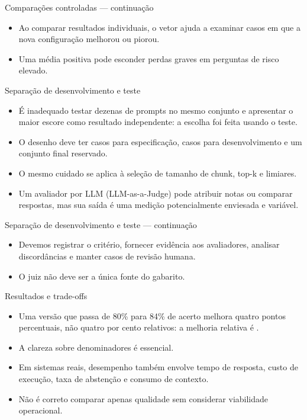 \documentclass[10pt,aspectratio=169]{beamer}
\begin{document}
\begin{frame}[t]{Comparações controladas — continuação}
\small
\begin{itemize}
\item Ao comparar resultados individuais, o vetor ajuda a examinar casos em que a nova configuração melhorou ou piorou.
\item Uma média positiva pode esconder perdas graves em perguntas de risco elevado.
\end{itemize}
\end{frame}

\begin{frame}[t]{Separação de desenvolvimento e teste}
\small
\begin{itemize}
\item É inadequado testar dezenas de prompts no mesmo conjunto e apresentar o maior escore como resultado independente: a escolha foi feita usando o teste.
\item O desenho deve ter casos para especificação, casos para desenvolvimento e um conjunto final reservado.
\item O mesmo cuidado se aplica à seleção de tamanho de chunk, top-k e limiares.
\item Um avaliador por LLM (LLM-as-a-Judge) pode atribuir notas ou comparar respostas, mas sua saída é uma medição potencialmente enviesada e variável.
\end{itemize}
\end{frame}

\begin{frame}[t]{Separação de desenvolvimento e teste — continuação}
\small
\begin{itemize}
\item Devemos registrar o critério, fornecer evidência aos avaliadores, analisar discordâncias e manter casos de revisão humana.
\item O juiz não deve ser a única fonte do gabarito.
\end{itemize}
\end{frame}

\begin{frame}[t]{Resultados e trade-offs}
\small
\begin{itemize}
\item Uma versão que passa de 80\% para 84\% de acerto melhora quatro pontos percentuais, não quatro por cento relativos: a melhoria relativa é .
\item A clareza sobre denominadores é essencial.
\item Em sistemas reais, desempenho também envolve tempo de resposta, custo de execução, taxa de abstenção e consumo de contexto.
\item Não é correto comparar apenas qualidade sem considerar viabilidade operacional.
\end{itemize}
\end{frame}
\end{document}
